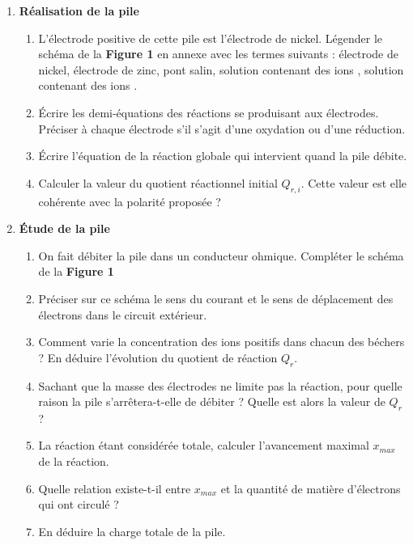 \documentclass[a4paper,11pt,fleqn]{article}%
\begin{document}
\begin{enumerate}
	\item \textbf{Réalisation de la pile}
	\begin{enumerate}[label=\theenumi.\arabic*]
		\item L'électrode positive de cette pile est l'électrode de nickel. Légender le schéma de la \textbf{Figure 1} en annexe avec les termes suivants : électrode de nickel, électrode de zinc, pont salin, solution contenant des ions , solution contenant des ions .
		\item Écrire les demi-équations des réactions se produisant aux électrodes. Préciser à chaque électrode s'il s'agit d'une oxydation ou d'une réduction.
		\item Écrire l'équation de la réaction globale qui intervient quand la pile débite.
		\item Calculer la valeur du quotient réactionnel initial $Q_{r,i}$. Cette valeur est elle cohérente avec la polarité proposée ?
	\end{enumerate}
	\item \textbf{Étude de la pile}
	\begin{enumerate}[label=\theenumi.\arabic*]
		\item On fait débiter la pile dans un conducteur ohmique. Compléter le schéma de la \textbf{Figure 1}
		\item Préciser sur ce schéma le sens du courant et le sens de déplacement des électrons dans le circuit extérieur.
		\item Comment varie la concentration des ions positifs dans chacun des béchers ? En déduire l'évolution du quotient de réaction $Q_r$.
		\item Sachant que la masse des électrodes ne limite pas la réaction, pour quelle raison la pile s'arrêtera-t-elle de débiter ? Quelle est alors la valeur de $Q_r$ ?
		\item La réaction étant considérée totale, calculer l'avancement maximal $x_{max}$ de la réaction.
		\item Quelle relation existe-t-il entre $x_{max}$ et la quantité de matière d'électrons qui ont circulé ?
		\item En déduire la charge totale de la pile.
	\end{enumerate}
\end{enumerate}
\end{document}
